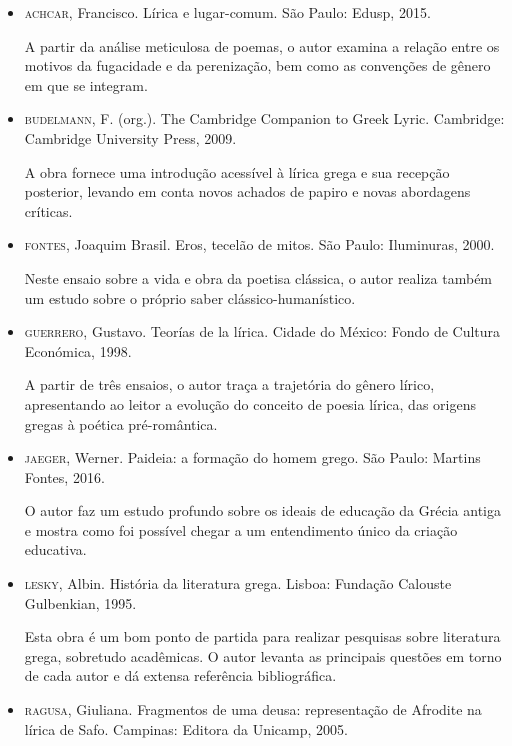 \documentclass[12pt]{extarticle}
\begin{document}
\begin{itemize}

\item \textsc{achcar}, Francisco. Lírica e lugar-comum. São Paulo: Edusp,
2015.

A partir da análise meticulosa de poemas, o autor examina a relação
entre os motivos da fugacidade e da perenização, bem como as convenções
de gênero em que se integram.

\item \textsc{budelmann}, F. (org.). The Cambridge Companion to Greek Lyric.
Cambridge: Cambridge University Press, 2009.

A obra fornece uma introdução acessível à lírica grega e sua recepção
posterior, levando em conta novos achados de papiro e novas abordagens
críticas.

\item \textsc{fontes}, Joaquim Brasil. Eros, tecelão de mitos. São Paulo:
Iluminuras, 2000.

Neste ensaio sobre a vida e obra da poetisa clássica, o autor realiza
também um estudo sobre o próprio saber clássico-humanístico.

\item \textsc{guerrero}, Gustavo. Teorías de la lírica. Cidade do México: Fondo
de Cultura Económica, 1998.

A partir de três ensaios, o autor traça a trajetória do gênero lírico,
apresentando ao leitor a evolução do conceito de poesia lírica, das
origens gregas à poética pré-romântica.

\item \textsc{jaeger}, Werner. Paideia: a formação do homem grego. São Paulo:
Martins Fontes, 2016.

O autor faz um estudo profundo sobre os ideais de educação da Grécia
antiga e mostra como foi possível chegar a um entendimento único da
criação educativa.

\item \textsc{lesky}, Albin. História da literatura grega. Lisboa: Fundação
Calouste Gulbenkian, 1995.

Esta obra é um bom ponto de partida para realizar pesquisas sobre
literatura grega, sobretudo acadêmicas. O autor levanta as principais
questões em torno de cada autor e dá extensa referência bibliográfica.

\item \textsc{ragusa}, Giuliana. Fragmentos de uma deusa: representação de
Afrodite na lírica de Safo. Campinas: Editora da Unicamp, 2005. 


\end{itemize}
\end{document}
